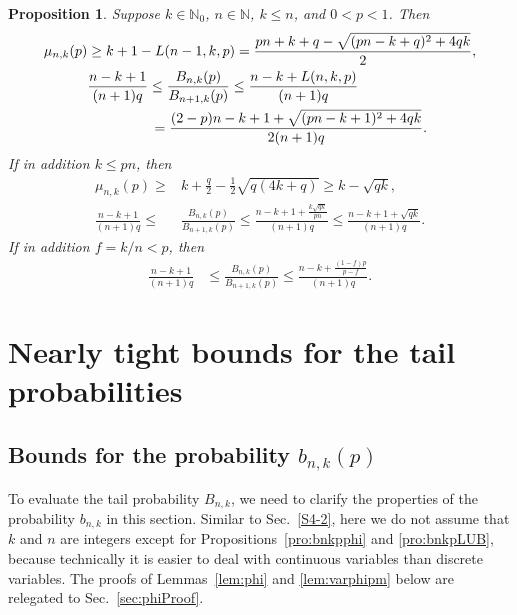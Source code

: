 \documentclass[aop]{imsart}
\theoremstyle{plain}
\newtheorem{proposition}[theorem]{Proposition}
\theoremstyle{remark}
\newcommand{\bbN}{\mathbb{N}}
\newcommand{\1}{\operatorname{\uppercase\expandafter{\romannumeral1}}}
\newcommand{\2}{\operatorname{\uppercase\expandafter{\romannumeral2}}}
\newcommand{\3}{\operatorname{\uppercase\expandafter{\romannumeral3}}}
\newcommand{\4}{\operatorname{\uppercase\expandafter{\romannumeral4}}}
\newcommand{\5}{\operatorname{\uppercase\expandafter{\romannumeral5}}}
\newcommand{\6}{\operatorname{\uppercase\expandafter{\romannumeral6}}}
\newcommand{\7}{\operatorname{\uppercase\expandafter{\romannumeral7}}}
\newcommand{\8}{\operatorname{\uppercase\expandafter{\romannumeral8}}}
\newcommand{\9}{\operatorname{\uppercase\expandafter{\romannumeral9}}}
\newcommand{\lsref}[1]{Lemmas~\ref{#1}}
\newcommand{\psref}[1]{Propositions~\ref{#1}}
\newcommand{\sref}[1]{Sec.~\ref{#1}}
\begin{document}
\begin{proposition}\label{pro:munkBBnkLBUB}
	Suppose  $k\in \bbN_0$, $n\in \bbN$, $k\leq n$, and $0<p<1$. Then 
	\begin{align}
	\mu_{n,k}(p)&\geq k+1-L(n-1,k,p)=\frac{pn+k+q-\sqrt{(pn-k+q)^2+4qk}}{2}	,\label{eq:mnkLBGen}\\
	&\frac{n-k+1}{(n+1)q}\leq \frac{B_{n,k}(p)}{B_{n+1,k}(p)}\leq \frac{n-k+L(n,k,p)}{(n+1)q} \label{eq:BnkBn+1kLBUB1} \\
  &\hphantom{\frac{B_{n,k}(p)}{B_{n+1,k}(p)}}	=\frac{(2-p )n-k+1+\sqrt{(p n-k+1)^2+4q k}}{2(n+1)q}. \nonumber
\end{align}
	If in addition $k\leq p n$, then 
	\begin{align}
	\mu_{n,k}(p)\geq &k+\frac{q}{2}-\frac{1}{2}\sqrt{q (4k+q )}\geq k-\sqrt{q k}, \label{eq:mnkLBsp}\\
	\frac{n-k+1}{(n+1)q}\leq &\frac{B_{n,k}(p)}{B_{n+1,k}(p)}\leq \frac{n-k+1+\frac{k\sqrt{q k}}{pn}}{(n+1)q }\leq \frac{n-k+1+\sqrt{q k}}{(n+1)q }. \label{eq:BnkBn+1kLBUB2}
	\end{align}
	If in addition $f=k/n<p$, then	
	\begin{align}
	\frac{n-k+1}{(n+1)q}&\leq \frac{B_{n,k}(p)}{B_{n+1,k}(p)}\leq \frac{n-k+\frac{(1-f)p}{p-f}}{(n+1)q }. \label{eq:BnkBn+1kLBUB3}
	\end{align}		
\end{proposition}




\section{Nearly tight bounds for the tail probabilities}\label{sec:TailBounds}



\subsection{Bounds for the probability $ b_{n,k}(p)$}\label{S5-1}
To evaluate the tail probability $B_{n,k}$, we need to clarify the properties of  the probability $b_{n,k}$
in this section.  Similar to \sref{S4-2},
here we do not assume that $k$ and $n$ are integers
except for  \psref{pro:bnkpphi} and \ref{pro:bnkpLUB},
because technically  it is easier to deal with continuous variables than discrete variables.
The proofs of \lsref{lem:phi} and \ref{lem:varphipm} below are relegated to \sref{sec:phiProof}. 
\end{document}
